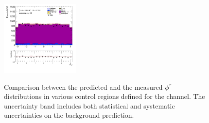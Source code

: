 \begin{figure}[!htp]
\begin{center}
			\includegraphics[width=0.35\textwidth]{chapters/chapter6_HPlus/images/taulep/tau_0_phi_SS_TAUMU.png} \\
			\end{center}
			\caption{
			Comparison between the predicted and the measured $\phi^{\tau}$ distributions in various control regions defined for the \taulep channel. The uncertainty band includes both statistical and systematic uncertainties on the background prediction. 
			}
			\label{fig:bkg-phi-tau-taulep}
		\end{figure}



